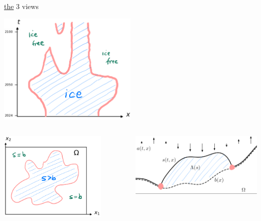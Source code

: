 \documentclass[10pt,dvipsnames]{beamer}
\begin{document}
\begin{frame}{\underline{the} 3 views}

\begin{center}
\includegraphics[width=0.5\textwidth]{xtcrop}
\end{center}

\begin{columns}
\begin{column}{0.45\textwidth}
\includegraphics[width=0.8\textwidth]{mapplane}
\end{column}
\begin{column}{0.55\textwidth}
\hfill \includegraphics[width=\textwidth]{stokesdomainpink}
\end{column}
\end{columns}
\end{frame}
\end{document}
